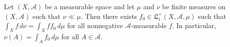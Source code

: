 Let $(X, \mathcal{A})$ be a measurable space and let $\mu$ and $\nu$ be finite measures on $(X, \mathcal{A})$ such that $\nu \ll \mu$. Then there exists $f_0 \in \mathfrak{L}_1^+(X, \mathcal{A}, \mu)$ such that $\int_X f \, d\nu = \int_X f f_0 \, d\mu$ for all nonnegative $\mathcal{A}$-measurable $f$. In particular, $\nu(A) = \int_A f_0 \, d\mu$ for all $A \in \mathcal{A}$.
